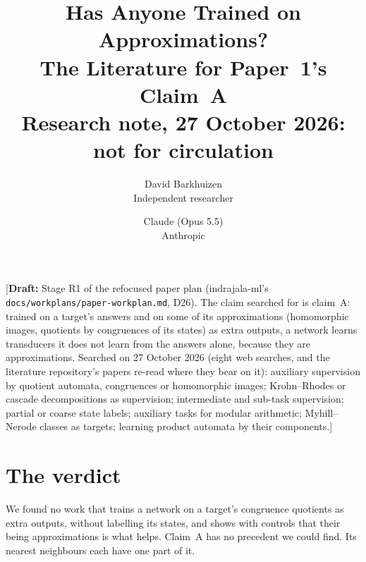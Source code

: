 \documentclass[11pt]{article}
\title{Has Anyone Trained on Approximations?\\The Literature for Paper~1's Claim~A\\[0.5em]
\large Research note, 27 October 2026: not for circulation}
\author{
  David Barkhuizen\\
  Independent researcher
  \and
  Claude (Opus 5.5)\\
  Anthropic
}
\date{}
\newcommand{\draftnote}[1]{\textcolor{red!70!black}{[\textbf{Draft:} #1]}}
\begin{document}
\maketitle

\draftnote{Stage R1 of the refocused paper plan (indrajala-ml's
\texttt{docs/\allowbreak workplans/\allowbreak paper-workplan.md}, D26). The claim searched for is
claim~A: trained on a target's answers and on some of its approximations (homomorphic images,
quotients by congruences of its states) as extra outputs, a network learns transducers it does not
learn from the answers alone, because they are approximations. Searched on 27 October 2026 (eight
web searches, and the literature repository's papers re-read where they bear on it): auxiliary
supervision by quotient automata, congruences or homomorphic images; Krohn--Rhodes or cascade
decompositions as supervision; intermediate and sub-task supervision; partial or coarse state
labels; auxiliary tasks for modular arithmetic; Myhill--Nerode classes as targets; learning product
automata by their components.}

\section{The verdict}

We found no work that trains a network on a target's congruence quotients as extra outputs, without
labelling its states, and shows with controls that their being approximations is what helps. Claim~A
has no precedent we could find. Its nearest neighbours each have one part of it.
\end{document}
